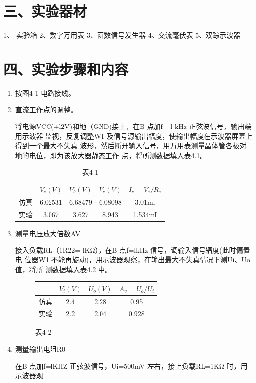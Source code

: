 \documentclass[a4paper,10pt,notitlepage]{article}
\begin{document}
	\section*{三、实验器材}
	1、 实验箱 2、数字万用表 3、函数信号发生器 4、交流毫伏表
	5、双踪示波器
	\section*{四、实验步骤和内容}
	\begin{enumerate}
		\item 按图4-1 电路接线。
		\item 直流工作点的调整。\par 
		\qquad 将电源VCC(+l2V)和地（GND)接上，在B 点加f= l kHz 正弦波信号，输出端用示波器
		监视，反复调整W1 及信号源输出幅度，使输出幅度在示波器屏幕上得到一个最大不失真
		波形，然后断开输入信号，用万用表测量晶体管各极对地的电位，即为该放大器静态工作
		点，将所测数据填入表4.1。
	\begin{table}[h]
			\centering
			\begin{tabular}{|c|c|c|c|c|}
				\hline
				& $V_e(V)$ & $V_b(V)$ & $V_c(V)$ & $I_c=V_e/R_e$ \\
				\hline
				仿真 & 6.02531 & 6.68479 & 6.08098 & 3.01mI \\
				\hline
				实验 & 3.067 & 3.627 & 8.943 & 1.534mI  \\
				\hline
			\end{tabular}
			\caption*{表4-1 }
	\end{table}
	\item 测量电压放大倍数AV\par 
	\qquad 接入负载RL（1R22= lKΩ），在B 点f=lkHz 信号，调输入信号辐度(此时偏置电
	位器W1 不能再旋动)，用示波器观察，在输出最大不失真情况下测Ui、Uo 值，将所
	测数据填入表4.2 中。\par 
	\begin{figure}[h]
		\centering
		\begin{tabular}{|c|c|c|c|}
			\hline
			& $V_i(V)$ & $U_o(V)$ & $A_v=U_o/U_i$ \\
			\hline
			仿真 & 2.4 & 2.28 &  0.95 \\
			\hline
			实验 & 2.2 & 2.04 & 0.928  \\
			\hline
		\end{tabular}
		\caption*{表4-2 }
	\end{figure}
	\item 测量输出电阻R0\par 
	\qquad 在B 点加f=lKHZ 正弦波信号，Ui=500mV 左右，接上负载RL=1KΩ 时，用示波器观

\end{enumerate}
\end{document}
